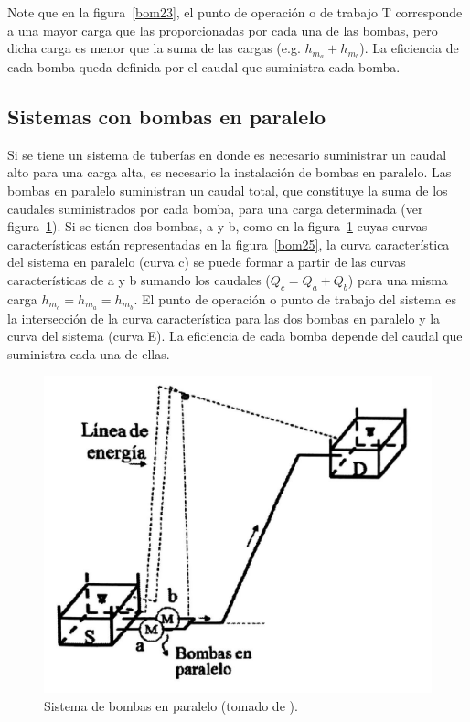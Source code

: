 \documentclass[11pt, oneside]{article}
\begin{document}
Note que en la figura~\ref{bom23}, el punto de operaci\'on o de trabajo T corresponde a una mayor carga que las proporcionadas por cada una de las bombas, pero dicha carga es menor que la suma de las cargas (e.g. $h_{m_a}+ h_{m_b}$). La eficiencia de cada bomba queda definida por el caudal que suministra cada bomba. 


\subsection{Sistemas con bombas en paralelo}
Si se tiene un sistema de tuber\'ias en donde es necesario suministrar un caudal alto para una carga alta, es necesario la instalaci\'on de bombas en paralelo. Las bombas en paralelo suministran un caudal total, que constituye la suma de los caudales suministrados por cada bomba, para una carga determinada (ver figura~\ref{bom24}). Si se tienen dos bombas, a y b, como en la figura~\ref{bom24} cuyas curvas caracter\'isticas est\'an representadas en la figura~\ref{bom25}, la curva caracter\'istica del sistema en paralelo (curva c) se puede formar a partir de las curvas caracter\'isticas de a y b sumando los caudales ($Q_c = Q_a + Q_b$) para una misma carga $h_{m_c}= h_{m_a}=h_{m_b}$. El punto de operaci\'on o punto de trabajo del sistema es la intersecci\'on de la curva caracter\'istica para las dos bombas en paralelo y la curva del sistema (curva E). La eficiencia de cada bomba depende del caudal que suministra cada una de ellas. 

\begin{figure}[h]
\centering
\includegraphics[width=12cm]{./figs/bom24.jpeg}
\caption{Sistema de bombas en paralelo (tomado de \cite{agudelo2011mecanica}).} 
\label{bom24}
\end{figure}
\end{document}
